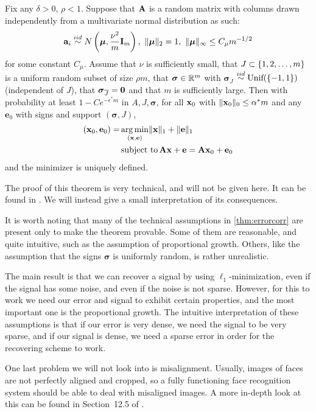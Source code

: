 \begin{theorem}
	\label{thm:errorcorr}
	Fix any $ \delta>0 $, $ \rho<1 $. Suppose that $ \mathbf{A} $ is a random matrix with columns drawn independently from a multivariate normal distribution as such:
	\[
		\mathbf{a}_{i} \stackrel{iid}{\sim} N\left(\boldsymbol{\mu}, \frac{\nu^{2}}{m}\mathbf{I}_{m}\right), ~ \lVert\boldsymbol{\mu}\rVert_{2} = 1, ~ \lVert\boldsymbol{\mu}\rVert_{\infty} \leq C_{\mu}m^{-1/2}
	\]
	for some constant $ C_{\mu} $. Assume that $ \nu $ is sufficiently small, that $ J \subset \{1, 2, \ldots, m\} $ is a uniform random subset of size $ \rho m $, that $ \boldsymbol{\sigma} \in \mathbb{R}^{m} $ with $ \boldsymbol{\sigma}_{J} $ $ \stackrel{iid}{\sim} \text{Unif}(\{-1, 1\}) $ (independent of $ J $), that $ \boldsymbol{\sigma}_{\overline{J}} = \mathbf{0} $ and that $ m $ is sufficiently large. Then with probability at least $ 1 - C e^{-\epsilon^{*}m} $ in $ A, J, \boldsymbol{\sigma} $, for all $ \mathbf{x}_{0} $ with $ \lVert\mathbf{x}_{0}\rVert_{0} \leq \alpha^{*}m $ and any $ \mathbf{e}_{0} $ with signs and support $ (\boldsymbol{\sigma}, J) $, 
	\begin{align*}
		\label{eq:errorcorr}
		(\mathbf{x}_{0}, \mathbf{e}_{0}) = & \operatorname*{arg\,min}_{(\mathbf{x},\mathbf{e})} \lVert\mathbf{x}\rVert_{1} + \lVert\mathbf{e}\rVert_{1} \\
                          & \operatorname*{subject~to} \mathbf{A}\mathbf{x} + \mathbf{e} = \mathbf{A}\mathbf{x}_{0} + \mathbf{e}_{0}
	\end{align*}
	and the minimizer is uniquely defined.
\end{theorem}

The proof of this theorem is very technical, and will not be given here. It can be found in \cite{wright10dense}. We will instead give a small interpretation of its consequences. 

It is worth noting that many of the technical assumptions in \cref{thm:errorcorr} are present only to make the theorem provable. Some of them are reasonable, and quite intuitive, such as the assumption of proportional growth. Others, like the assumption that the signs $ \boldsymbol{\sigma} $ is uniformly random, is rather unrealistic. 

The main result is that we can recover a signal by using $ \ell_{1} $-minimization, even if the signal has some noise, and even if the noise is not sparse. However, for this to work we need our error and signal to exhibit certain properties, and the most important one is the proportional growth. The intuitive interpretation of these assumptions is that if our error is very dense, we need the signal to be very sparse, and if our signal is dense, we need a sparse error in order for the recovering scheme to work. 

One last problem we will not look into is misalignment. Usually, images of faces are not perfectly aligned and cropped, so a fully functioning face recognition system should be able to deal with misaligned images. A more in-depth look at this can be found in Section~12.5 of \cite{eldar12theoryapplic}.









